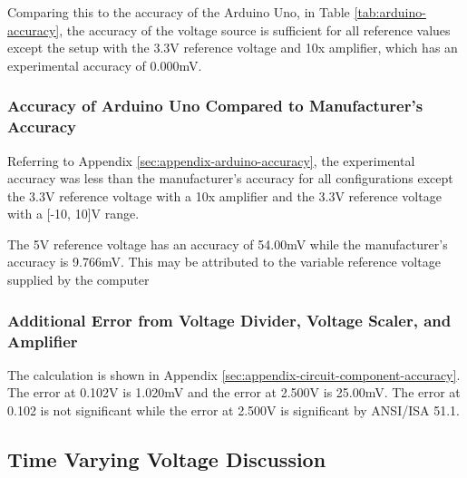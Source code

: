 Comparing this to the accuracy of the Arduino Uno, in Table \ref{tab:arduino-accuracy}, the accuracy of 
the voltage source is sufficient for all reference values except the setup with the 3.3V reference voltage and 10x amplifier, which has an experimental accuracy of 0.000mV.


\subsubsection{Accuracy of Arduino Uno Compared to Manufacturer's Accuracy}
Referring to Appendix \ref{sec:appendix-arduino-accuracy}, the experimental accuracy was less than the manufacturer's accuracy for all configurations 
except the 3.3V reference voltage with a 10x amplifier and the 3.3V reference voltage with a [-10, 10]V range.

The 5V reference voltage has an accuracy of 54.00mV while the manufacturer's accuracy is 9.766mV. This may be attributed to the variable reference voltage supplied by the computer


\subsubsection{Additional Error from Voltage Divider, Voltage Scaler, and Amplifier}

The calculation is shown in Appendix \ref{sec:appendix-circuit-component-accuracy}. The error at 0.102V is 1.020mV and the error at 2.500V is 25.00mV. The error at 0.102 
is not significant while the error at 2.500V is significant by ANSI/ISA 51.1.

\subsection{Time Varying Voltage Discussion}











        